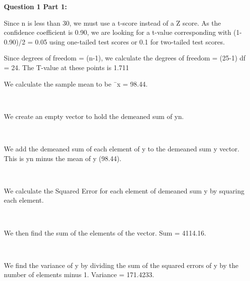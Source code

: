 \documentclass[12pt,letterpaper]{article}
\begin{document}
\noindent
\textbf{Question 1 Part 1:}
\\\vspace{.5cm}

\noindent 
Since n is less than 30, we must use a t-score instead of a Z score. As the confidence coefficient is 0.90, we are looking for a t-value corresponding with (1-0.90)/2 = 0.05 using one-tailed test scores or 0.1 for 
two-tailed test scores.\\\vspace{.5cm}

\noindent
Since degrees of freedom = (n-1), we calculate the degrees of freedom = (25-1)
df = 24. The T-value at these points is 1.711
\\\vspace{.5cm}

\noindent
We calculate the sample mean to be ¯x = 98.44.

  
\noindent
\\\vspace{.0cm}

\noindent
We create an empty vector to hold the demeaned sum of yn.

  
\noindent
\\\vspace{.0cm}

\noindent
We add the demeaned sum of each element of y to the demeaned sum y vector. This is yn minus the mean of y (98.44).


\noindent
\\\vspace{.0cm}

\noindent
We calculate the Squared Error for each element of demeaned sum y by squaring each element.


\noindent
\\\vspace{.0cm}

\noindent
We then find the sum of the elements of the vector. Sum = 4114.16.


\noindent
\\\vspace{.0cm}

\noindent
We find the variance of y by dividing the sum of the squared errors of y by the number of elements minus 1. Variance = 171.4233.
\end{document}

